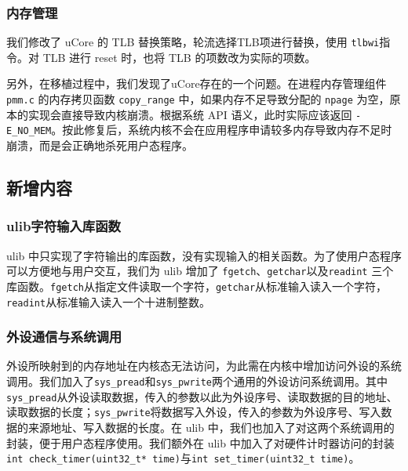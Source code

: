 
\subsubsection{内存管理}
我们修改了 uCore 的 TLB 替换策略，轮流选择TLB项进行替换，使用 \texttt{tlbwi}指令。对 TLB 进行 reset 时，也将 TLB 的项数改为实际的项数。

另外，在移植过程中，我们发现了uCore存在的一个问题。在进程内存管理组件 \texttt{pmm.c} 的内存拷贝函数 \texttt{copy\_range} 中，如果内存不足导致分配的 \texttt{npage} 为空，原本的实现会直接导致内核崩溃。根据系统 API 语义，此时实际应该返回 \texttt{-E\_NO\_MEM}。按此修复后，系统内核不会在应用程序申请较多内存导致内存不足时崩溃，而是会正确地杀死用户态程序。

\subsection{新增内容}

\subsubsection{ulib字符输入库函数}
ulib 中只实现了字符输出的库函数，没有实现输入的相关函数。为了使用户态程序可以方便地与用户交互，我们为 ulib 增加了 \texttt{fgetch}、\texttt{getchar}以及\texttt{readint} 三个库函数。\texttt{fgetch}从指定文件读取一个字符，\texttt{getchar}从标准输入读入一个字符，\texttt{readint}从标准输入读入一个十进制整数。

\subsubsection{外设通信与系统调用}

外设所映射到的内存地址在内核态无法访问，为此需在内核中增加访问外设的系统调用。我们加入了\texttt{sys\_pread}和\texttt{sys\_pwrite}两个通用的外设访问系统调用。其中\texttt{sys\_pread}从外设读取数据，传入的参数以此为外设序号、读取数据的目的地址、读取数据的长度；\texttt{sys\_pwrite}将数据写入外设，传入的参数为外设序号、写入数据的来源地址、写入数据的长度。在 ulib 中，我们也加入了对这两个系统调用的封装，便于用户态程序使用。我们额外在 ulib 中加入了对硬件计时器访问的封装\texttt{int check\_timer(uint32\_t* time)}与\texttt{int set\_timer(uint32\_t time)}。

